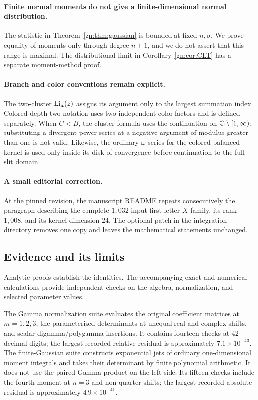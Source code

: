 \paragraph{Finite normal moments do not give a finite-dimensional
normal distribution.}
The statistic in Theorem~\ref{gn:thm:gaussian} is bounded at fixed
$n,\sigma$. We prove equality of moments only through degree
$n+1$, and we do not assert that this range is maximal.
The distributional limit in Corollary~\ref{gn:cor:CLT} has a
separate moment-method proof.

\paragraph{Branch and color conventions remain explicit.}
The two-cluster $\operatorname{Li}_{\boldsymbol a}(z)$ assigns its argument only
to the largest summation index. Colored depth-two notation uses
two independent color factors and is defined separately.
When $C<B$, the cluster formula uses the continuation on
$\mathbb C\setminus[1,\infty)$; substituting a divergent power series
at a negative argument of modulus greater than one is not valid.
Likewise, the ordinary $\omega$ series for the colored balanced
kernel is used only inside its disk of convergence before
continuation to the full slit domain.

\paragraph{A small editorial correction.}
At the pinned revision, the manuscript README repeats consecutively
the paragraph describing the complete $1{,}032$-input first-letter
$X$ family, its rank $1{,}008$, and its kernel dimension $24$.
The optional patch in the integration directory removes one
copy and leaves the mathematical statements unchanged.

\subsection{Evidence and its limits}

Analytic proofs establish the identities. The accompanying exact
and numerical calculations provide independent checks on the
algebra, normalization, and selected parameter values.

The Gamma normalization suite evaluates the original coefficient
matrices at $m=1,2,3$, the parameterized determinants at unequal
real and complex shifts, and scalar digamma/polygamma insertions.
It contains fourteen checks at $42$ decimal digits; the largest
recorded relative residual is approximately $7.1\times10^{-43}$.
The finite-Gaussian suite constructs exponential jets of ordinary
one-dimensional moment integrals and takes their determinant by
finite polynomial arithmetic. It does not use the paired Gamma
product on the left side. Its fifteen checks include the fourth
moment at $n=3$ and non-quarter shifts; the largest recorded
absolute residual is approximately $4.9\times10^{-41}$.

